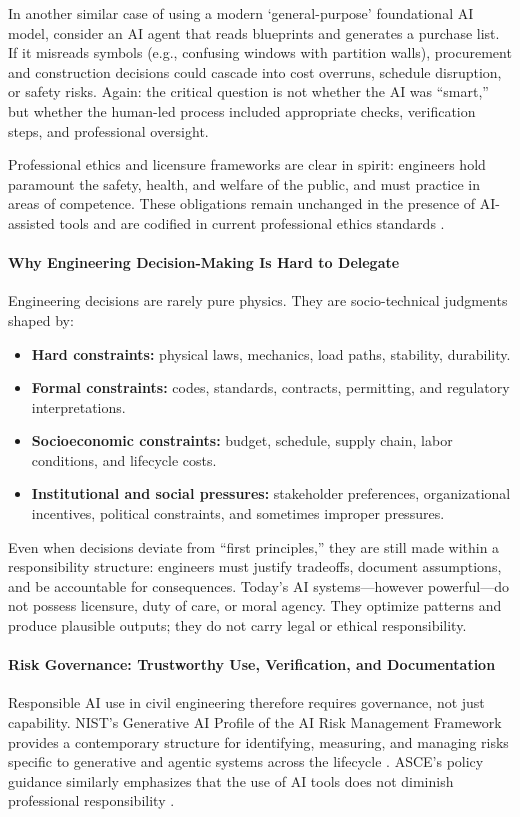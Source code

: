 \documentclass[12pt]{article}
\begin{document}
In another similar case of using a modern `general-purpose' foundational AI model, consider an AI agent that reads blueprints and generates a purchase list. If it misreads symbols (e.g., confusing windows with partition walls), procurement and construction decisions could cascade into cost overruns, schedule disruption, or safety risks. Again: the critical question is not whether the AI was ``smart,'' but whether the human-led process included appropriate checks, verification steps, and professional oversight.


Professional ethics and licensure frameworks are clear in spirit: engineers hold paramount the safety, health, and welfare of the public, and must practice in areas of competence. These obligations remain unchanged in the presence of AI-assisted tools and are codified in current professional ethics standards \cite{asce_code_of_ethics_current_2020,nspe_code_of_ethics_web}.


\paragraph{Why Engineering Decision-Making Is Hard to Delegate}
Engineering decisions are rarely pure physics. They are socio-technical judgments shaped by:
\begin{itemize}
\item \textbf{Hard constraints:} physical laws, mechanics, load paths, stability, durability.
\item \textbf{Formal constraints:} codes, standards, contracts, permitting, and regulatory interpretations.
\item \textbf{Socioeconomic constraints:} budget, schedule, supply chain, labor conditions, and lifecycle costs.
\item \textbf{Institutional and social pressures:} stakeholder preferences, organizational incentives, political constraints, and sometimes improper pressures.
\end{itemize}

Even when decisions deviate from ``first principles,'' they are still made within a responsibility structure: engineers must justify tradeoffs, document assumptions, and be accountable for consequences. Today’s AI systems—however powerful—do not possess licensure, duty of care, or moral agency. They optimize patterns and produce plausible outputs; they do not carry legal or ethical responsibility.

\paragraph{Risk Governance: Trustworthy Use, Verification, and Documentation}
Responsible AI use in civil engineering therefore requires governance, not just capability. NIST’s Generative AI Profile of the AI Risk Management Framework provides a contemporary structure for identifying, measuring, and managing risks specific to generative and agentic systems across the lifecycle \cite{nist_ai_rmf_genai_profile_2024}. ASCE’s policy guidance similarly emphasizes that the use of AI tools does not diminish professional responsibility \cite{asce_ps573_2024}.
\end{document}
